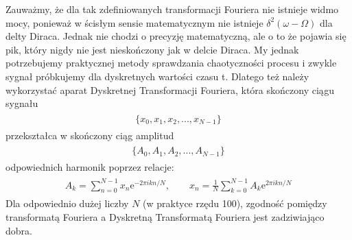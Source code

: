 \documentclass[a4paper,12pt,polish]{sphinxmanual}
\begin{document}
Zauważmy, że dla tak zdefiniowanych  transformacji Fouriera nie istnieje widmo mocy, ponieważ w ścisłym sensie matematycznym nie istnieje $\delta^2(\omega -\Omega)$ dla delty Diraca. Jednak nie chodzi o precyzję matematyczną, ale o to że pojawia się pik, który nigdy nie jest nieskończony jak w delcie Diraca. My jednak potrzebujemy praktycznej metody sprawdzania chaotyczności procesu i zwykle sygnał próbkujemy dla dyskretnych wartości czasu t. Dlatego też należy wykorzystać aparat Dyskretnej Transformacji Fouriera, która  skończony ciągu sygnału
\label{ch2/chII012:equation-eqn25}\begin{gather}
\begin{split}\{x_0, x_1, x_2, ..., x_{N-1}\}\end{split}\label{ch2/chII012-eqn25}
\end{gather}
przekształca w skończony ciąg amplitud
\label{ch2/chII012:equation-eqn26}\begin{gather}
\begin{split}\{A_0, A_1, A_2, ..., A_{N-1}\}\end{split}\label{ch2/chII012-eqn26}
\end{gather}
odpowiednich harmonik poprzez relacje:
\label{ch2/chII012:equation-eqn27}\begin{gather}
\begin{split}A_k = \sum_{n=0}^{N-1}  x_n  \mbox{e}^{- 2\pi i k n/N}, \qquad x_n = \frac{1}{N}  \sum_{k=0}^{N-1}  A_k  \mbox{e}^{2\pi i k n/N}\end{split}\label{ch2/chII012-eqn27}
\end{gather}
Dla odpowiednio dużej liczby $N$ (w praktyce rzędu 100), zgodność pomiędzy transformatą Fouriera a Dyskretną Transformatą Fouriera jest zadziwiająco dobra.
\end{document}
